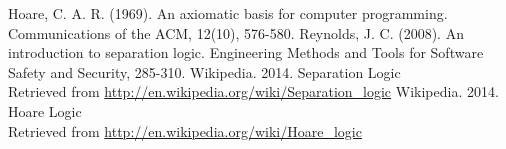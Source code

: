 
\begin{thebibliography}{}
    \bibitem{}
    	Hoare, C. A. R. (1969). An axiomatic basis for computer programming. Communications of the ACM, 12(10), 576-580.
    \bibitem{}
    	Reynolds, J. C. (2008). An introduction to separation logic. Engineering Methods and Tools for Software Safety and Security, 285-310.
        Wikipedia. 2014. Separation Logic\\ Retrieved from \url{http://en.wikipedia.org/wiki/Separation\_logic}
        Wikipedia. 2014. Hoare Logic\\ Retrieved from \url{http://en.wikipedia.org/wiki/Hoare_logic}
\end{thebibliography}